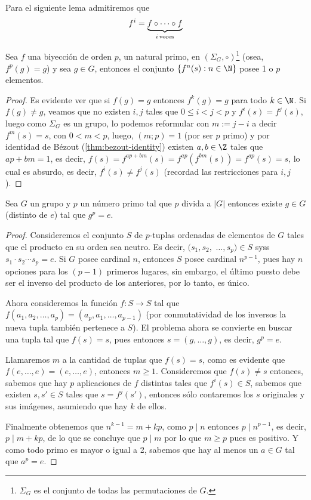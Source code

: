 \documentclass[11pt,oneside]{book}
\begin{document}
Para el siguiente lema admitiremos que
$$f^i=\underbrace{f\circ\cdots\circ f}_{i\,\rm veces}$$
\begin{lem}
Sea $f$ una biyección de orden $p$, un natural primo, en $(\Sigma_G,\circ)$\footnote{$\Sigma_G$ es el conjunto de todas las permutaciones de $G$.} (osea, $f^p(g)=g$) y sea $g\in G$, entonces el conjunto $\{f^n(s):n\in\N\}$ posee 1 o $p$ elementos.
\end{lem}
\begin{proof}
Es evidente ver que si $f(g)=g$ entonces $f^k(g)=g$ para todo $k\in\N$. Si $f(g)\neq g$, veamos que no existen $i,j$ tales que $0\leq i\lt j\lt p$ y $f^i(s)=f^j(s)$, luego como $\Sigma_G$ es un grupo, lo podemos reformular con $m:=j-i$ a decir $f^m(s)=s$, con $0\lt m\lt p$, luego, $(m;p)=1$ (por ser $p$ primo) y por identidad de Bézout (\ref{thm:bezout-identity}) existen $a,b\in\Z$ tales que $ap+bm=1$, es decir, $f(s)=f^{ap+bm}(s)=f^{ap}(f^{bm}(s))=f^{ap}(s)=s$, lo cual es absurdo, es decir, $f^i(s)\neq f^j(s)$ (recordad las restricciones para $i,j$).
\end{proof}
\begin{thm}
Sea $G$ un grupo y $p$ un número primo tal que $p$ divida a $|G|$ entonces existe $g\in G$ (distinto de $e$) tal que $g^p=e$.
\end{thm}
\begin{proof}
Consideremos el conjunto $S$ de $p$-tuplas ordenadas de elementos de $G$ tales que el producto en su orden sea neutro. Es decir, $(s_1,s_2,$ $\dots,s_p)\in S$ syss $s_1\cdot s_2\cdots s_p=e$. Si $G$ posee cardinal $n$, entonces $S$ posee cardinal $n^{p-1}$, pues hay $n$ opciones para los $(p-1)$ primeros lugares, sin embargo, el último puesto debe ser el inverso del producto de los anteriores, por lo tanto, es único.

Ahora consideremos la función $f:S\rightarrow S$ tal que $f(a_1,a_2,\dots,a_p)=(a_p,a_1,\dots,a_{p-1})$ (por conmutatividad de los inversos la nueva tupla también pertenece a $S$). El problema ahora se convierte en buscar una tupla tal que $f(s)=s$, pues entonces $s=(g,\dots, g)$, es decir, $g^p=e$. 

Llamaremos $m$ a la cantidad de tuplas que $f(s)=s$, como es evidente que $f(e,\dots, e)=(e,\dots, e)$, entonces $m\geq 1$. Consideremos que $f(s)\neq s$ entonces, sabemos que hay $p$ aplicaciones de $f$ distintas tales que $f^i(s)\in S$, sabemos que existen $s,s'\in S$ tales que $s=f^j(s')$, entonces sólo contaremos los $s$ originales y sus imágenes, asumiendo que hay $k$ de ellos.

Finalmente obtenemos que $n^{k-1}=m+kp$, como $p\mid n$ entonces $p\mid n^{p-1}$, es decir, $p\mid m+kp$, de lo que se concluye que $p\mid m$ por lo que $m\geq p$ pues es positivo. Y como todo primo es mayor o igual a 2, sabemos que hay al menos un $a\in G$ tal que $a^p=e$.
\end{proof}
\end{document}
